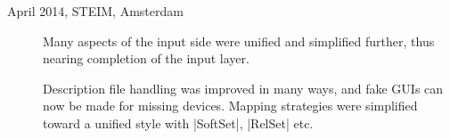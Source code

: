 \documentclass{article}
\begin{document}
\begin{description}
	
		
		
		
		
	\item[April 2014, STEIM, Amsterdam] 	Many aspects of the input side were unified and simplified further, thus nearing completion of the input layer.

Description file handling was improved in many ways, and fake GUIs can now be made for missing devices. Mapping strategies were simplified toward a unified style with |SoftSet|, |RelSet| etc. 


\end{description}
\end{document}
